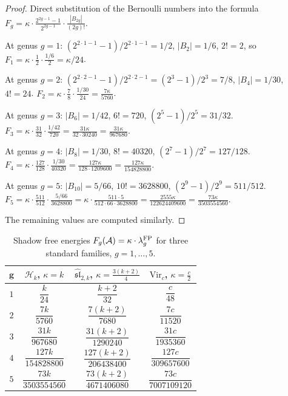 \begin{proof}
Direct substitution of the Bernoulli numbers into the
formula
$F_g = \kappa \cdot \frac{2^{2g-1}-1}{2^{2g-1}} \cdot \frac{|B_{2g}|}{(2g)!}$.

At genus $g = 1$: $(2^{2 \cdot 1 - 1} - 1)/2^{2 \cdot 1 - 1} = 1/2$, $|B_2| = 1/6$, $2! = 2$, so $F_1 = \kappa \cdot \frac{1}{2} \cdot \frac{1/6}{2} = \kappa/24$.

At genus $g = 2$: $(2^{2 \cdot 2 - 1} - 1)/2^{2 \cdot 2 - 1} = (2^3 - 1)/2^3 = 7/8$, $|B_4| = 1/30$, $4! = 24$. $F_2 = \kappa \cdot \frac{7}{8} \cdot \frac{1/30}{24} = \frac{7\kappa}{5760}$.

At genus $g = 3$: $|B_6| = 1/42$, $6! = 720$, $(2^5 - 1)/2^5 = 31/32$. $F_3 = \kappa \cdot \frac{31}{32} \cdot \frac{1/42}{720} = \frac{31\kappa}{32 \cdot 30240} = \frac{31\kappa}{967680}$.

At genus $g = 4$: $|B_8| = 1/30$, $8! = 40320$, $(2^7 - 1)/2^7 = 127/128$. $F_4 = \kappa \cdot \frac{127}{128} \cdot \frac{1/30}{40320} = \frac{127\kappa}{128 \cdot 1209600} = \frac{127\kappa}{154828800}$.

At genus $g = 5$: $|B_{10}| = 5/66$, $10! = 3628800$, $(2^9 - 1)/2^9 = 511/512$. $F_5 = \kappa \cdot \frac{511}{512} \cdot \frac{5/66}{3628800} = \kappa \cdot \frac{511 \cdot 5}{512 \cdot 66 \cdot 3628800} = \frac{2555\kappa}{122624409600} = \frac{73\kappa}{3503554560}$.

The remaining values are computed similarly.
\end{proof}

\begin{table}[ht]
\centering
\caption{Shadow free energies $F_g(\mathcal{A}) = \kappa \cdot \lambda_g^{\mathrm{FP}}$ for three standard families, $g = 1, \ldots, 5$.}
\label{tab:thqg-I-Fg-specializations}
\renewcommand{\arraystretch}{1.5}
{\footnotesize
\begin{tabular}{|c|c|c|c|}
\hline
$\boldsymbol{g}$ & $\mathcal{H}_k$, $\kappa = k$ & $\widehat{\mathfrak{sl}}_{2,k}$, $\kappa = \frac{3(k+2)}{4}$ & $\mathrm{Vir}_c$, $\kappa = \frac{c}{2}$ \\
\hline
$1$ & $\dfrac{k}{24}$ & $\dfrac{k+2}{32}$ & $\dfrac{c}{48}$ \\[6pt]
\hline
$2$ & $\dfrac{7k}{5760}$ & $\dfrac{7(k+2)}{7680}$ & $\dfrac{7c}{11520}$ \\[6pt]
\hline
$3$ & $\dfrac{31k}{967680}$ & $\dfrac{31(k+2)}{1290240}$ & $\dfrac{31c}{1935360}$ \\[6pt]
\hline
$4$ & $\dfrac{127k}{154828800}$ & $\dfrac{127(k+2)}{206438400}$ & $\dfrac{127c}{309657600}$ \\[6pt]
\hline
$5$ & $\dfrac{73k}{3503554560}$ & $\dfrac{73(k+2)}{4671406080}$ & $\dfrac{73c}{7007109120}$ \\[6pt]
\hline
\end{tabular}}
\end{table}

